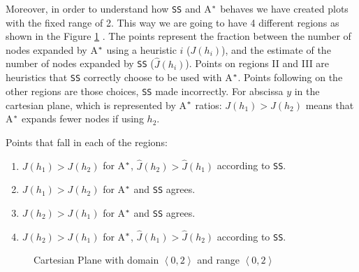 Moreover, in order to understand how \texttt{SS} and A$\sp{*}$ behaves we have created plots with the fixed range of 2. This way we are going to have 4 different regions as shown in the Figure \ref{fig:img_cartesian_plane} . The points represent the fraction between the  number of nodes expanded by A$\sp{*}$ using a heuristic $i$ ($J(h_{i})$), and the estimate of the number of nodes expanded by \texttt{SS} ($\hat{J}(h_{i})$). Points on regions II and III are heuristics that \texttt{SS} correctly choose to be used with A$\sp{*}$. Points following on the other regions are those choices, \texttt{SS} made incorrectly. For abscissa $y$ in the cartesian plane, which is represented by A$\sp{*}$ ratios: $J(h_{1}) > J(h_{2})$ means that A$\sp{*}$ expands fewer nodes if using $h_{2}$.

Points that fall in each of the regions:
\begin{enumerate}[label=\Roman*] 
\item $J(h_{1}) > J(h_{2})$ for A$\sp{*}$, $\hat{J}(h_{2}) > \hat{J}(h_{1})$ according to \texttt{SS}.
\item $J(h_{1}) > J(h_{2})$ for A$\sp{*}$ and \texttt{SS} agrees.
\item $J(h_{2}) > J(h_{1})$ for A$\sp{*}$ and \texttt{SS} agrees.
\item $J(h_{2}) > J(h_{1})$ for A$\sp{*}$, $\hat{J}(h_{1}) > \hat{J}(h_{2})$ according to \texttt{SS}.
\end{enumerate}

\pagestyle{empty}

\begin{figure}[!htb]
\centering  
{}
  \caption{Cartesian Plane with domain $\left\langle 0, 2\right\rangle$ and range $\left\langle 0, 2\right\rangle$ }\label{fig:img_cartesian_plane}
\end{figure}


